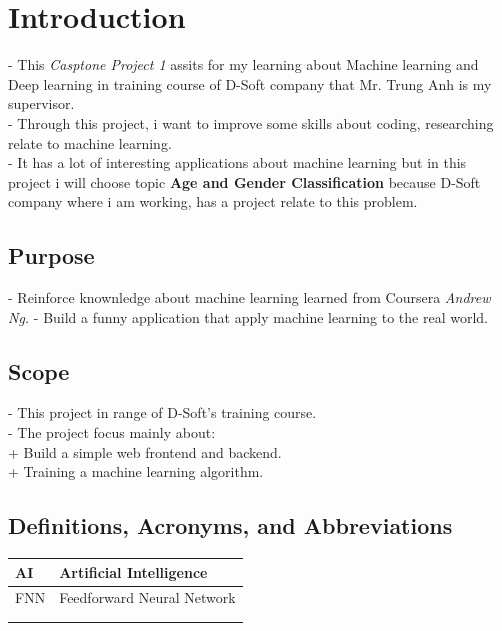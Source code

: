 
\usepackage{graphicx}
\graphicspath{ {./figs/} }

\maketitle
\newpage

\tableofcontents
\newpage
\section{Introduction}
- This \textit{Casptone Project 1} assits for my learning about Machine learning and Deep learning in training course of D-Soft company that Mr. Trung Anh is my supervisor. \\
- Through this project, i want to improve some skills about coding, researching relate to machine learning.\\
- It has a lot of interesting applications about machine learning but in this project i will choose topic \textbf{Age and Gender Classification} because D-Soft company where i am working, has a project relate to this problem.

\subsection{Purpose}
- Reinforce knownledge about machine learning learned from Coursera \textit{Andrew Ng.}
- Build a funny application that apply machine learning to the real world.
\subsection{Scope}
- This project in range of D-Soft's training course.\\
- The project focus mainly about: \\
\indent + Build a simple web frontend and backend. \\
\indent + Training a machine learning algorithm.

\subsection{Definitions, Acronyms, and Abbreviations} 
\begin{center}
\begin{tabular}{|m{3cm}|m{8cm}|} 
 \hline
 AI & Artificial Intelligence \\
 \hline
 FNN & Feedforward Neural Network \\
 \hline
  & \\
 \hline
  & \\
 \hline
\end{tabular}
\end{center}

